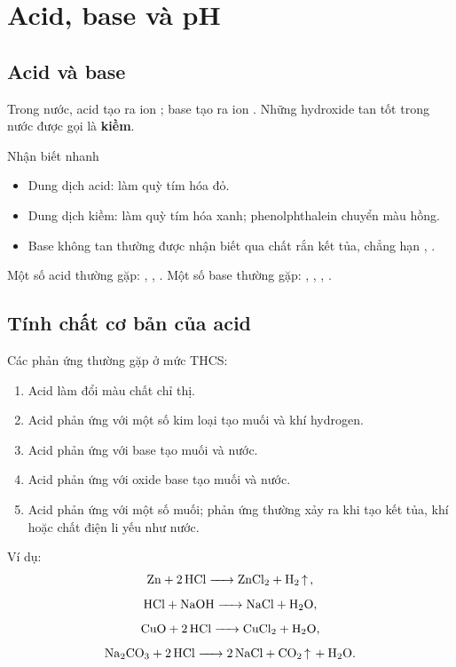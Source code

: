 \section{Acid, base và pH}

\subsection{Acid và base}

Trong nước, acid tạo ra ion ; base tạo ra ion . Những hydroxide tan tốt trong nước được gọi là \textbf{kiềm}.

\begin{ghinho}{Nhận biết nhanh}
\begin{itemize}
\item Dung dịch acid: làm quỳ tím hóa đỏ.
\item Dung dịch kiềm: làm quỳ tím hóa xanh; phenolphthalein chuyển màu hồng.
\item Base không tan thường được nhận biết qua chất rắn kết tủa, chẳng hạn , .
\end{itemize}
\end{ghinho}

Một số acid thường gặp: , , . Một số base thường gặp: , , , .

\subsection{Tính chất cơ bản của acid}

Các phản ứng thường gặp ở mức THCS:

\begin{enumerate}
\item Acid làm đổi màu chất chỉ thị.
\item Acid phản ứng với một số kim loại tạo muối và khí hydrogen.
\item Acid phản ứng với base tạo muối và nước.
\item Acid phản ứng với oxide base tạo muối và nước.
\item Acid phản ứng với một số muối; phản ứng thường xảy ra khi tạo kết tủa, khí hoặc chất điện li yếu như nước.
\end{enumerate}

Ví dụ:
\[
\ce{Zn + 2HCl -> ZnCl2 + H2 ^},
\]
\[
\ce{HCl + NaOH -> NaCl + H2O},
\]
\[
\ce{CuO + 2HCl -> CuCl2 + H2O},
\]
\[
\ce{Na2CO3 + 2HCl -> 2NaCl + CO2 ^ + H2O}.
\]

